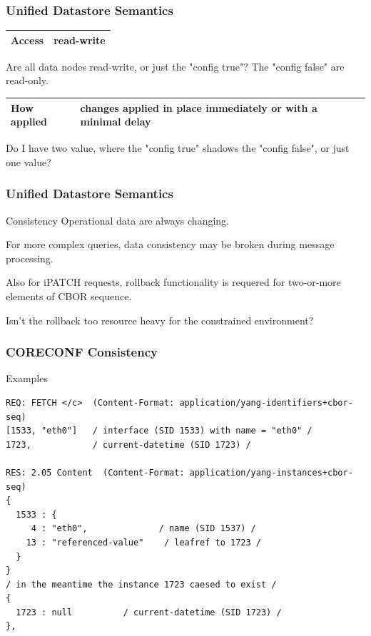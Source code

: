 \documentclass[aspectratio=169]{beamer}
\begin{document}
\begin{frame}
  \frametitle{Unified Datastore Semantics}

  \newlength{\fNameWidth}
  \settowidth{\fNameWidth}{YANG modules}
  \newlength{\fValueWidth}
  \settowidth{\fValueWidth}{chagnes applied in place immediately or with minimal delay}
  \begin{tabular}{ | m{\fNameWidth} | m{\fValueWidth} | }
    \hline
    Access & read-write \\
    \hline
  \end{tabular}
  \vspace{0.5em}

  Are all data nodes read-write, or just the "config true"? The "config false" are read-only.

  \vspace{1em}
  \begin{tabular}{ | m{\fNameWidth} | m{\fValueWidth} | }
    \hline
    How applied & changes applied in place immediately or with a
                  minimal delay \\
    \hline
  \end{tabular}
  \vspace{0.5em}

  Do I have two value, where the "config true" shadows the "config false", or just one value?  
\end{frame}


\begin{frame}
  \frametitle{Unified Datastore Semantics}

  \begin{block}{Consistency}
    Operational data are always changing.

    For more complex queries, data consistency may be broken during message processing.

    Also for iPATCH requests, rollback functionality is requered for two-or-more
    elements of CBOR sequence.

    \vspace{1em}
    Isn't the rollback too resource heavy for the constrained environment?
  \end{block}
\end{frame}

\begin{frame}[fragile]
  \frametitle{CORECONF Consistency}

  \begin{block}{Examples}
\footnotesize \begin{verbatim}
REQ: FETCH </c>  (Content-Format: application/yang-identifiers+cbor-seq)
[1533, "eth0"]   / interface (SID 1533) with name = "eth0" /
1723,            / current-datetime (SID 1723) /

RES: 2.05 Content  (Content-Format: application/yang-instances+cbor-seq)
{
  1533 : {
     4 : "eth0",              / name (SID 1537) /
    13 : "referenced-value"    / leafref to 1723 /
  }
}
/ in the meantime the instance 1723 caesed to exist /
{
  1723 : null          / current-datetime (SID 1723) /
},
\end{verbatim}
  \end{block}
\end{frame}
\end{document}
